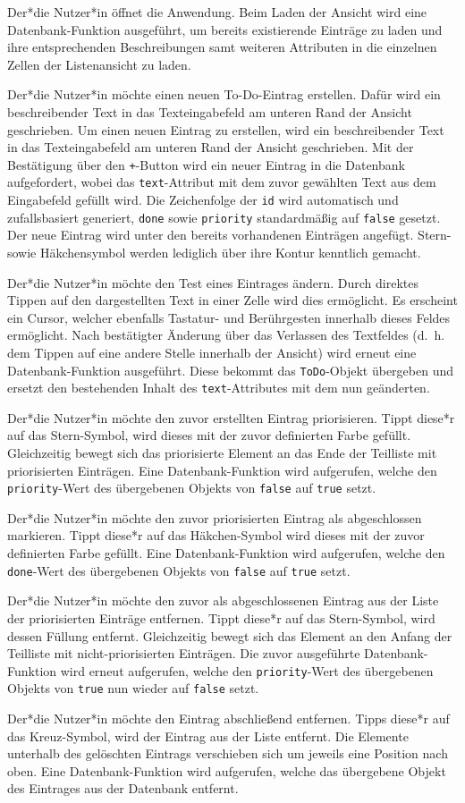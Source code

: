 Der*die Nutzer*in öffnet die Anwendung. Beim Laden der Ansicht wird eine Datenbank-Funktion ausgeführt, um bereits existierende Einträge zu laden und ihre entsprechenden Beschreibungen samt weiteren Attributen in die einzelnen Zellen der Listenansicht zu laden. 

Der*die Nutzer*in möchte einen neuen To-Do-Eintrag erstellen. Dafür wird ein beschreibender Text in das Texteingabefeld am unteren Rand der Ansicht geschrieben. Um einen neuen Eintrag zu erstellen, wird ein beschreibender Text in das Texteingabefeld am unteren Rand der Ansicht geschrieben. Mit der Bestätigung über den \texttt{+}-Button wird ein neuer Eintrag in die Datenbank aufgefordert, wobei das \texttt{text}-Attribut mit dem zuvor gewählten Text aus dem Eingabefeld gefüllt wird. Die Zeichenfolge der \texttt{id} wird automatisch und zufallsbasiert generiert, \texttt{done} sowie \texttt{priority} standardmäßig auf \texttt{false} gesetzt. Der neue Eintrag wird unter den bereits vorhandenen Einträgen angefügt. Stern- sowie Häkchensymbol werden lediglich über ihre Kontur kenntlich gemacht.

Der*die Nutzer*in möchte den Test eines Eintrages ändern. Durch direktes Tippen auf den dargestellten Text in einer Zelle wird dies ermöglicht. Es erscheint ein Cursor, welcher ebenfalls Tastatur- und Berührgesten innerhalb dieses Feldes ermöglicht. Nach bestätigter Änderung über das Verlassen des Textfeldes (d.\ h. dem Tippen auf eine andere Stelle innerhalb der Ansicht) wird erneut eine Datenbank-Funktion ausgeführt. Diese bekommt das \texttt{ToDo}-Objekt übergeben und ersetzt den bestehenden Inhalt des \texttt{text}-Attributes mit dem nun geänderten.

Der*die Nutzer*in möchte den zuvor erstellten Eintrag priorisieren. Tippt diese*r auf das Stern-Symbol, wird dieses mit der zuvor definierten Farbe gefüllt. Gleichzeitig bewegt sich das priorisierte Element an das Ende der Teilliste mit priorisierten Einträgen. Eine Datenbank-Funktion wird aufgerufen, welche den \texttt{priority}-Wert des übergebenen Objekts von \texttt{false} auf \texttt{true} setzt.

Der*die Nutzer*in möchte den zuvor priorisierten Eintrag als abgeschlossen markieren. Tippt diese*r auf das Häkchen-Symbol wird dieses mit der zuvor definierten Farbe gefüllt. Eine Datenbank-Funktion wird aufgerufen, welche den \texttt{done}-Wert des übergebenen Objekts von \texttt{false} auf \texttt{true} setzt.

Der*die Nutzer*in möchte den zuvor als abgeschlossenen Eintrag aus der Liste der priorisierten Einträge entfernen. Tippt diese*r auf das Stern-Symbol, wird dessen Füllung entfernt. Gleichzeitig bewegt sich das Element an den Anfang der Teilliste mit nicht-priorisierten Einträgen. Die zuvor ausgeführte Datenbank-Funktion wird erneut aufgerufen, welche den \texttt{priority}-Wert des übergebenen Objekts von \texttt{true} nun wieder auf \texttt{false} setzt.

Der*die Nutzer*in möchte den Eintrag abschließend entfernen. Tipps diese*r auf das Kreuz-Symbol, wird der Eintrag aus der Liste entfernt. Die Elemente unterhalb des gelöschten Eintrags verschieben sich um jeweils eine Position nach oben. Eine Datenbank-Funktion wird aufgerufen, welche das übergebene Objekt des Eintrages aus der Datenbank entfernt.
